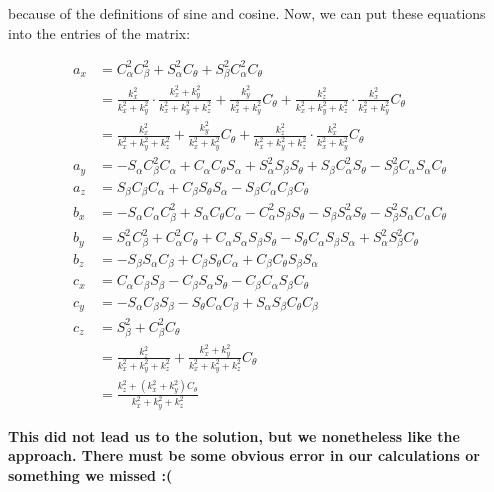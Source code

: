 \documentclass[a4paper,11pt]{article}
\begin{document}
\begin {enumerate}
		because of the definitions of sine and cosine. Now, we can put these equations into the entries of the matrix:

		\begin{align*}
			a_x &= C_{\alpha}^2C_{\beta}^2 + S_{\alpha}^2C_{\theta} + S_{\beta}^2C_{\alpha}^2C_{\theta}\\
			&= \frac{k_x^2}{k_x^2 + k_y^2} \cdot \frac{k_x^2 + k_y^2}{k_x^2 + k_y^2 + k_z^2} + \frac{k_y^2}{k_x^2+k_y^2}C_{\theta} + \frac{k_z^2}{k_x^2+k_y^2+k_z^2} \cdot \frac{k_x^2}{k_x^2+k_y^2}C_{\theta}\\
			&= \frac{k_x^2}{k_x^2 + k_y^2 + k_z^2} + \frac{k_y^2}{k_x^2+k_y^2}C_{\theta} + \frac{k_z^2}{k_x^2+k_y^2+k_z^2} \cdot \frac{k_x^2}{k_x^2+k_y^2}C_{\theta}\\
			a_y &= -S_{\alpha}C_{\beta}^2C_{\alpha} + C_{\alpha}C_{\theta}S_{\alpha} + S_{\alpha}^2S_{\beta}S_{\theta} + S_{\beta}C_{\alpha}^2S_{\theta} - S_{\beta}^2C_{\alpha}S_{\alpha}C_{\theta}\\
			a_z &= S_{\beta}C_{\beta}C_{\alpha} + C_{\beta}S_{\theta}S_{\alpha} - S_{\beta}C_{\alpha}C_{\beta}C_{\theta}\\
			b_x &= -S_{\alpha}C_{\alpha}C_{\beta}^2 + S_{\alpha}C_{\theta}C_{\alpha} - C_{\alpha}^2S_{\beta}S_{\theta} - S_{\beta}S_{\alpha}^2S_{\theta} - S_{\beta}^2S_{\alpha}C_{\alpha}C_{\theta}\\
			b_y &= S_{\alpha}^2C_{\beta}^2 + C_{\alpha}^2C_{\theta} + C_{\alpha}S_{\alpha}S_{\beta}S_{\theta} - S_{\theta}C_{\alpha}S_{\beta}S_{\alpha} + S_{\alpha}^2S_{\beta}^2C_{\theta}\\
			b_z &= -S_{\beta}S_{\alpha}C_{\beta} + C_{\beta}S_{\theta}C_{\alpha} + C_{\beta}C_{\theta}S_{\beta}S_{\alpha}\\
			c_x &= C_{\alpha}C_{\beta}S_{\beta} - C_{\beta}S_{\alpha}S_{\theta} - C_{\beta}C_{\alpha}S_{\beta}C_{\theta}\\
			c_y &= -S_{\alpha}C_{\beta}S_{\beta} - S_{\theta}C_{\alpha}C_{\beta} + S_{\alpha}S_{\beta}C_{\theta}C_{\beta}\\
			c_z &= S_{\beta}^2 + C_{\beta}^2C_{\theta}\\
			&= \frac{k_z^2}{k_x^2+k_y^2+k_z^2} + \frac{k_x^2 + k_y^2}{k_x^2 + k_y^2 + k_z^2} C_{\theta}\\
			&= \frac{k_z^2 + (k_x^2 + k_y^2) C_{\theta}}{k_x^2 + k_y^2 + k_z^2}
		\end{align*}

		\textbf{This did not lead us to the solution, but we nonetheless like the approach. There must be
		some obvious error in our calculations or something we missed :(}



\end{enumerate}
\end{document}
